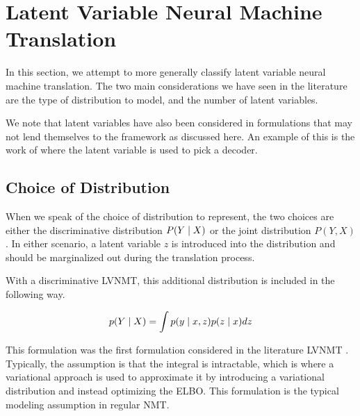 \chapter{Latent Variable Neural Machine Translation}


In this section, we attempt to more generally classify latent variable neural machine translation. The two main considerations we have seen in the literature are the type of distribution to model, and the number of latent variables. 

We note that latent variables have also been considered in formulations that may not lend themselves to the framework as discussed here. An example of this is the work of  where the latent variable is used to pick a decoder. 




\section{Choice of Distribution}

When we speak of the choice of distribution to represent, the two choices are either the discriminative distribution $P(Y \; | \;{X})$ or the joint distribution $P(Y , X)$. In either scenario, a latent variable $z$ is introduced into the distribution and should be marginalized out during the translation process. 

With a discriminative \ac{LVNMT}, this additional distribution is included in the following way. 

\begin{equation}
p(Y \; | \;{X})  = \int p(y \; | \;{x,z}) p(z \; | \;{x}) dz
\end{equation}

This formulation was the first formulation considered in the literature \ac{LVNMT} \cite{Zhang2016VNMT}. Typically, the assumption is that the integral is intractable, which is where a variational approach is used to approximate it by introducing a variational distribution and instead optimizing the \ac{ELBO}. This formulation is the typical modeling assumption in regular \ac{NMT}. 

